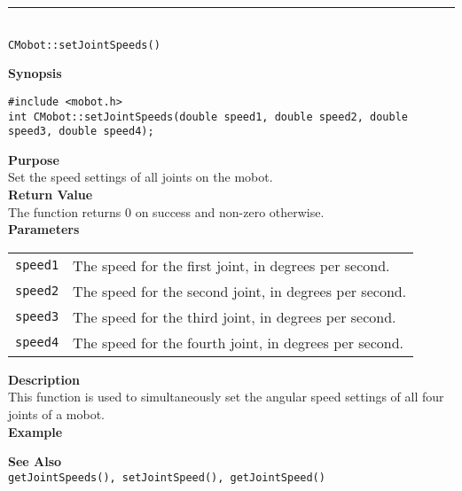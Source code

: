 \noindent
\vspace{5pt}
\rule{4.5in}{0.015in}\\
\noindent
{\LARGE \texttt{CMobot::setJointSpeeds()}}\\
{}

\noindent
{\bf Synopsis}
\vspace{-8pt}
\begin{verbatim}
#include <mobot.h>
int CMobot::setJointSpeeds(double speed1, double speed2, double speed3, double speed4);
\end{verbatim}

\noindent
{\bf Purpose}\\
Set the speed settings of all joints on the mobot.\\

\noindent
{\bf Return Value}\\
The function returns 0 on success and non-zero otherwise.\\

\noindent
{\bf Parameters}
\vspace{-0.1in}
\begin{description}
\item               
\begin{tabular}{p{10 mm}p{145 mm}}
\texttt{speed1} & The speed for the first joint, in degrees per second. \\
\texttt{speed2} & The speed for the second joint, in degrees per second. \\
\texttt{speed3} & The speed for the third joint, in degrees per second. \\
\texttt{speed4} & The speed for the fourth joint, in degrees per second. \\
\end{tabular}
\end{description}

\noindent
{\bf Description}\\
This function is used to simultaneously set the angular speed settings of
all four joints of a mobot. \\

\noindent
{\bf Example}\\
\noindent

\noindent
{\bf See Also}\\
\texttt{getJointSpeeds(), setJointSpeed(), getJointSpeed()}

